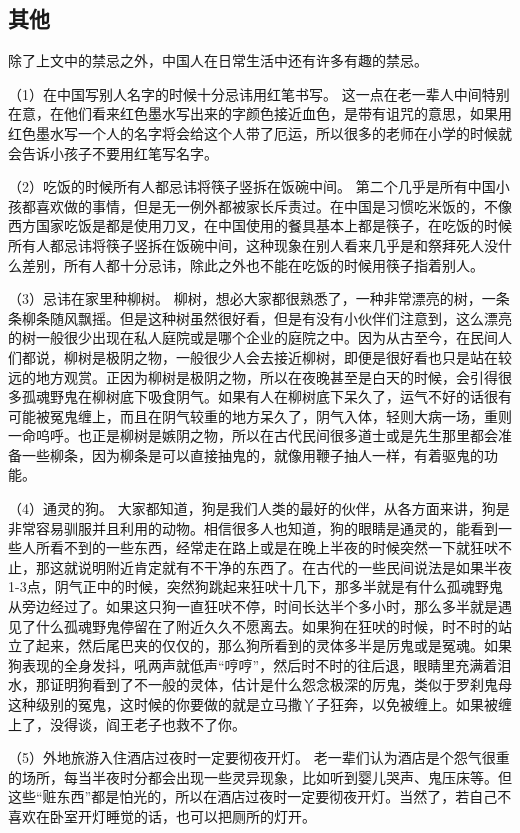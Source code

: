 \subsection{其他}

    除了上文中的禁忌之外，中国人在日常生活中还有许多有趣的禁忌。
    
   （1）在中国写别人名字的时候十分忌讳用红笔书写。
   这一点在老一辈人中间特别在意，在他们看来红色墨水写出来的字颜色接近血色，是带有诅咒的意思，如果用红色墨水写一个人的名字将会给这个人带了厄运，所以很多的老师在小学的时候就会告诉小孩子不要用红笔写名字。

   （2）吃饭的时候所有人都忌讳将筷子竖拆在饭碗中间。
   第二个几乎是所有中国小孩都喜欢做的事情，但是无一例外都被家长斥责过。在中国是习惯吃米饭的，不像西方国家吃饭是都是使用刀叉，在中国使用的餐具基本上都是筷子，在吃饭的时候所有人都忌讳将筷子竖拆在饭碗中间，这种现象在别人看来几乎是和祭拜死人没什么差别，所有人都十分忌讳，除此之外也不能在吃饭的时候用筷子指着别人。

   （3）忌讳在家里种柳树。
   柳树，想必大家都很熟悉了，一种非常漂亮的树，一条条柳条随风飘摇。但是这种树虽然很好看，但是有没有小伙伴们注意到，这么漂亮的树一般很少出现在私人庭院或是哪个企业的庭院之中。因为从古至今，在民间人们都说，柳树是极阴之物，一般很少人会去接近柳树，即便是很好看也只是站在较远的地方观赏。正因为柳树是极阴之物，所以在夜晚甚至是白天的时候，会引得很多孤魂野鬼在柳树底下吸食阴气。如果有人在柳树底下呆久了，运气不好的话很有可能被冤鬼缠上，而且在阴气较重的地方呆久了，阴气入体，轻则大病一场，重则一命呜呼。也正是柳树是嫉阴之物，所以在古代民间很多道士或是先生那里都会准备一些柳条，因为柳条是可以直接抽鬼的，就像用鞭子抽人一样，有着驱鬼的功能。

   （4）通灵的狗。
   大家都知道，狗是我们人类的最好的伙伴，从各方面来讲，狗是非常容易驯服并且利用的动物。相信很多人也知道，狗的眼睛是通灵的，能看到一些人所看不到的一些东西，经常走在路上或是在晚上半夜的时候突然一下就狂吠不止，那这就说明附近肯定就有不干净的东西了。在古代的一些民间说法是如果半夜1-3点，阴气正中的时候，突然狗跳起来狂吠十几下，那多半就是有什么孤魂野鬼从旁边经过了。如果这只狗一直狂吠不停，时间长达半个多小时，那么多半就是遇见了什么孤魂野鬼停留在了附近久久不愿离去。如果狗在狂吠的时候，时不时的站立了起来，然后尾巴夹的仅仅的，那么狗所看到的灵体多半是厉鬼或是冤魂。如果狗表现的全身发抖，吼两声就低声“哼哼”，然后时不时的往后退，眼睛里充满着泪水，那证明狗看到了不一般的灵体，估计是什么怨念极深的厉鬼，类似于罗刹鬼母这种级别的冤鬼，这时候的你要做的就是立马撒丫子狂奔，以免被缠上。如果被缠上了，没得谈，阎王老子也救不了你。

   （5）外地旅游入住酒店过夜时一定要彻夜开灯。
   老一辈们认为酒店是个怨气很重的场所，每当半夜时分都会出现一些灵异现象，比如听到婴儿哭声、鬼压床等。但这些“赃东西”都是怕光的，所以在酒店过夜时一定要彻夜开灯。当然了，若自己不喜欢在卧室开灯睡觉的话，也可以把厕所的灯开。

